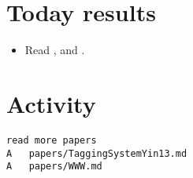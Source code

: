 \section*{Today results}
\begin{itemize}
	\item Read \cite{TwitterHong2012}, \cite{nestedChinese13} and \cite{TaggingSystemYin13}.
\end{itemize}

\section*{Activity}
\begin{verbatim}
read more papers
A	papers/TaggingSystemYin13.md
A	papers/WWW.md
\end{verbatim}
